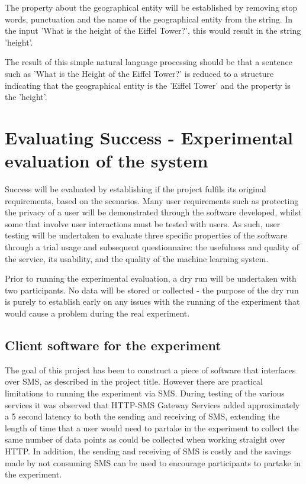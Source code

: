 \documentclass[authoryearcitations]{UoYCSproject}
\begin{document}
The property about the geographical entity will be established by removing stop words, punctuation and the name of the geographical entity from the string.  In the input 'What is the height of the Eiffel Tower?', this would result in the string 'height'.

The result of this simple natural language processing should be that a sentence such as 'What is the Height of the Eiffel Tower?' is reduced to a structure indicating that the geographical entity is the 'Eiffel Tower' and the property is the 'height'.

\section{Evaluating Success - Experimental evaluation of the system}
\label{sec:evaluatingSuccess}
Success will be evaluated by establishing if the project fulfils its original requirements, based on the scenarios.  Many user requirements such as protecting the privacy of a user will be demonstrated through the software developed, whilst some that involve user interactions must be tested with users.  As such, user testing will be undertaken to evaluate three specific properties of the software through a trial usage and subsequent questionnaire: the usefulness and quality of the service, its usability, and the quality of the machine learning system.

Prior to running the experimental evaluation, a dry run will be undertaken with two participants. No data will be stored or collected - the purpose of the dry run is purely to establish early on any issues with the running of the experiment that would cause a problem during the real experiment.

\subsection{Client software for the experiment}
\label{subsec:clientSoftware}
The goal of this project has been to construct a piece of software that interfaces over SMS, as described in the project title. However there are practical limitations to running the experiment via SMS. During testing of the various services it was observed that HTTP-SMS Gateway Services added approximately a 5 second latency to both the sending and receiving of SMS, extending the length of time that a user would need to partake in the experiment to collect the same number of data points as could be collected when working straight over HTTP. In addition, the sending and receiving of SMS is costly and the savings made by not consuming SMS can be used to encourage participants to partake in the experiment. 
\end{document}
